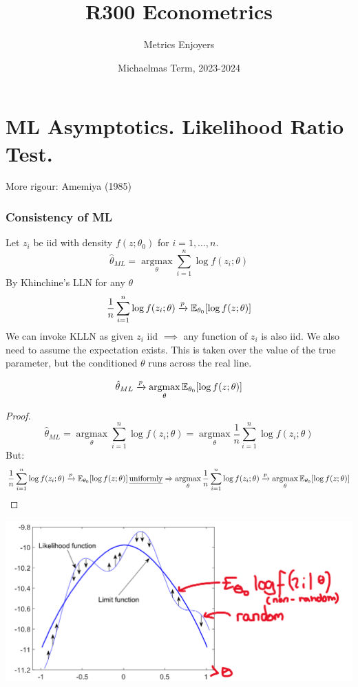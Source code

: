 \documentclass[DIV=14,titlepage=false]{scrreprt}
\title{%
R300 Econometrics}
\author{Metrics Enjoyers}
\date{Michaelmas Term, 2023-2024}
\begin{document}
\chapter{ML Asymptotics. Likelihood Ratio Test.}

More rigour: Amemiya (1985)

\subsection{Consistency of ML}

Let \(z_i\) be iid with density \(f(z;\theta_0)\) for \(i=1,\dots,n\).
\[\hat{\theta}_{ML}=\operatorname*{argmax}_{\theta}\sum_{i=1}^n\log f(z_i;\theta)\]
By Khinchine's LLN for any \(\theta\)
\[\frac{1}{n}\sum_{i=1}^n\log f(z_i;\theta)\xrightarrow{p}\mathbb{E}_{\theta_0}[\log f(z;\theta)]\]
We can invoke KLLN as given \(z_i\) iid \(\implies\) any function of \(z_i\) is also iid. We also need to assume the expectation exists. This is taken over the value of the true parameter, but the conditioned \(\theta\) runs across the real line.
\vspace{5mm}
\begin{prop}
\[\hat{\theta}_{ML}\xrightarrow{p}\operatorname*{argmax}_{\theta}\mathbb{E}_{\theta_0}[\log f(z;\theta)]\]
\end{prop}
\vspace{5mm}
\begin{proof}
\[\hat{\theta}_{ML}=\operatorname*{argmax}_{\theta}\sum_{i=1}^n\log f(z_i;\theta)=\operatorname*{argmax}_{\theta}\frac{1}{n}\sum_{i=1}^n\log f(z_i;\theta)\]
But:
\[\frac{1}{n}\sum_{i=1}^n\log f(z_i;\theta)\xrightarrow{p}\mathbb{E}_{\theta_0}[\log f(z;\theta)] \,\text{\underline{uniformly}} \Rightarrow \operatorname*{argmax}_{\theta}\frac{1}{n}\sum_{i=1}^n\log f(z_i;\theta)\xrightarrow{p}\operatorname*{argmax}_{\theta}\mathbb{E}_{\theta_0}[\log f(z;\theta)] \]
\end{proof}
\begin{center}
\includegraphics[width=\textwidth]{ML Asymptotics.png}
\end{center}
\end{document}
